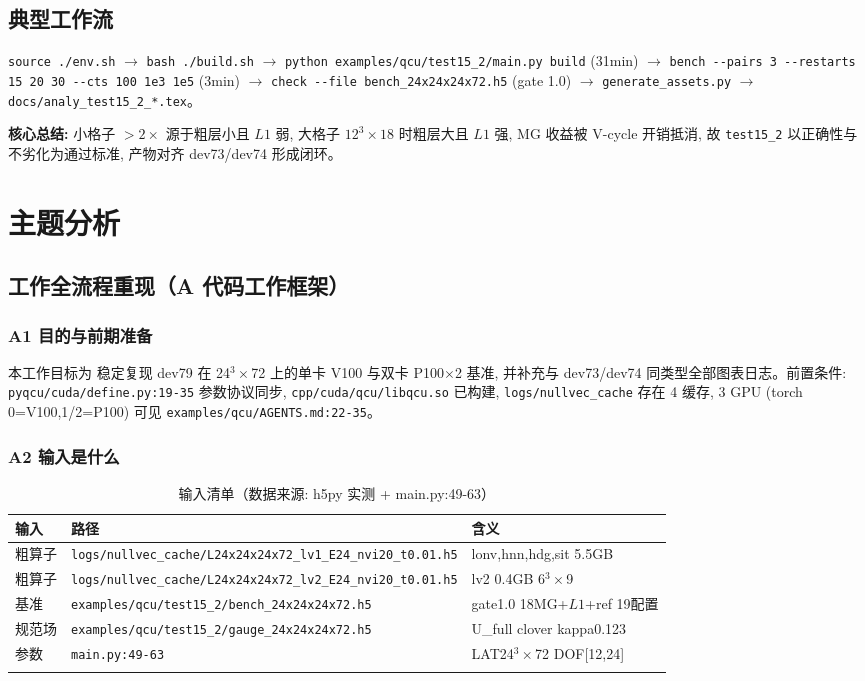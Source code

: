 \documentclass[UTF8]{ctexart}
\begin{document}
\subsection{典型工作流}
\texttt{\nolinkurl{source ./env.sh}} $\to$ \texttt{\nolinkurl{bash ./build.sh}} $\to$ \texttt{\nolinkurl{python examples/qcu/test15_2/main.py build}} (31min) $\to$ \texttt{\nolinkurl{bench --pairs 3 --restarts 15 20 30 --cts 100 1e3 1e5}} (3min) $\to$ \texttt{\nolinkurl{check --file bench_24x24x24x72.h5}} (gate 1.0) $\to$ \texttt{\nolinkurl{generate_assets.py}} $\to$ \texttt{\nolinkurl{docs/analy_test15_2_*.tex}}。

\begin{ideabox}
\textbf{核心总结:} 小格子 $>2\times$ 源于粗层小且 $L1$ 弱, 大格子 $12^3\times18$ 时粗层大且 $L1$ 强, MG 收益被 V-cycle 开销抵消, 故 \texttt{\nolinkurl{test15_2}} 以正确性与不劣化为通过标准, 产物对齐 dev73/dev74 形成闭环。
\end{ideabox}

\section{主题分析}
\subsection{工作全流程重现（A 代码工作框架）}

\subsubsection{A1 目的与前期准备}
本工作目标为 \textcolor{struct}{稳定复现 dev79 在 24$^3\times$72 上的单卡 V100 与双卡 P100$\times$2 基准, 并补充与 dev73/dev74 同类型全部图表日志}。前置条件: \texttt{\nolinkurl{pyqcu/cuda/define.py:19-35}} 参数协议同步, \texttt{\nolinkurl{cpp/cuda/qcu/libqcu.so}} 已构建, \texttt{\nolinkurl{logs/nullvec_cache}} 存在 4 缓存, 3 GPU (torch 0=V100,1/2=P100) 可见 \textcolor{evidence}{\texttt{\nolinkurl{examples/qcu/AGENTS.md:22-35}}}。

\subsubsection{A2 输入是什么}
\begin{xltabular}{\textwidth}{lXl}
\toprule
输入 & 路径 & 含义 \\
\midrule
\endhead
粗算子 & \texttt{\nolinkurl{logs/nullvec_cache/L24x24x24x72_lv1_E24_nvi20_t0.01.h5}} & lonv,hnn,hdg,sit 5.5GB \\
粗算子 & \texttt{\nolinkurl{logs/nullvec_cache/L24x24x24x72_lv2_E24_nvi20_t0.01.h5}} & lv2 0.4GB 6$^3\times$9 \\
基准 & \texttt{\nolinkurl{examples/qcu/test15_2/bench_24x24x24x72.h5}} & gate1.0 18MG+$L1$+ref 19配置 \\
规范场 & \texttt{\nolinkurl{examples/qcu/test15_2/gauge_24x24x24x72.h5}} & U\_full clover kappa0.123 \\
参数 & \texttt{\nolinkurl{main.py:49-63}} & LAT24$^3\times$72 DOF[12,24] \\
\bottomrule
\caption{输入清单（数据来源: h5py 实测 + main.py:49-63）}
\end{xltabular}
\end{document}
